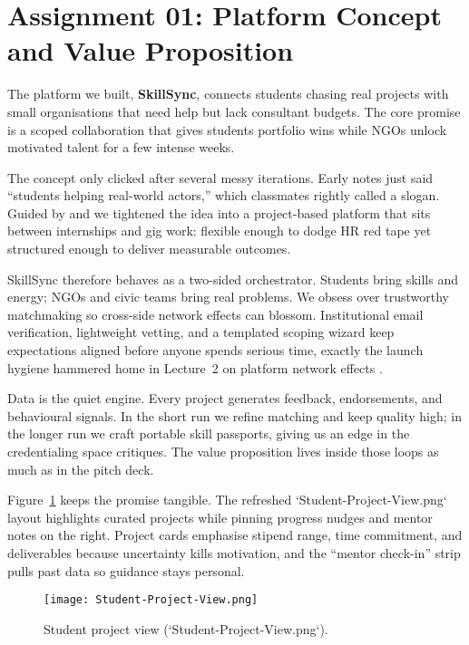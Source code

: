 \section*{Assignment 01: Platform Concept and Value Proposition}

The platform we built, \textbf{SkillSync}, connects students chasing real projects with small organisations that need help but lack consultant budgets. The core promise is a scoped collaboration that gives students portfolio wins while NGOs unlock motivated talent for a few intense weeks.

The concept only clicked after several messy iterations. Early notes just said ``students helping real-world actors,'' which classmates rightly called a slogan. Guided by \citet{Choudary2016} and \citet{Srnicek2017} we tightened the idea into a project-based platform that sits between internships and gig work: flexible enough to dodge HR red tape yet structured enough to deliver measurable outcomes.

SkillSync therefore behaves as a two-sided orchestrator. Students bring skills and energy; NGOs and civic teams bring real problems. We obsess over trustworthy matchmaking so cross-side network effects can blossom. Institutional email verification, lightweight vetting, and a templated scoping wizard keep expectations aligned before anyone spends serious time, exactly the launch hygiene hammered home in Lecture~2 on platform network effects \citep{Lecture02}.

Data is the quiet engine. Every project generates feedback, endorsements, and behavioural signals. In the short run we refine matching and keep quality high; in the longer run we craft portable skill passports, giving us an edge in the credentialing space \citet{Zuboff2019} critiques. The value proposition lives inside those loops as much as in the pitch deck.

Figure~\ref{fig:student-view} keeps the promise tangible. The refreshed `Student-Project-View.png` layout highlights curated projects while pinning progress nudges and mentor notes on the right. Project cards emphasise stipend range, time commitment, and deliverables because uncertainty kills motivation, and the ``mentor check-in'' strip pulls past data so guidance stays personal.

\begin{figure}[h]
  \centering
  \texttt{[image: Student-Project-View.png]}
  \caption{Student project view (`Student-Project-View.png`).}
  \label{fig:student-view}
\end{figure}

